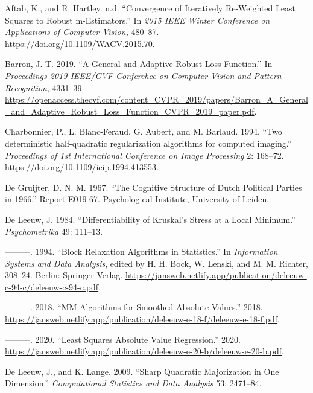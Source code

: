 \documentclass[
  12pt,
  letterpaper,
  DIV=11,
  numbers=noendperiod]{scrartcl}
\newlength{\cslhangindent}
\newenvironment{CSLReferences}[2] %
 {\begin{list}{}{%
  \setlength{\itemindent}{0pt}
  \setlength{\leftmargin}{0pt}
  \setlength{\parsep}{0pt}
  \ifodd #1
   \setlength{\leftmargin}{\cslhangindent}
   \setlength{\itemindent}{-1\cslhangindent}
  \fi
  \setlength{\itemsep}{#2\baselineskip}}}
 {\end{list}}
\begin{document}
\label{refs}
\begin{CSLReferences}{1}{0}
Aftab, K., and R. Hartley. n.d. {``Convergence of Iteratively
Re-Weighted Least Squares to Robust m-Estimators.''} In \emph{2015 IEEE
Winter Conference on Applications of Computer Vision,} 480--87.
\url{https://doi.org/10.1109/WACV.2015.70}.

Barron, J. T. 2019. {``A General and Adaptive Robust Loss Function.''}
In \emph{Proceedings 2019 IEEE/CVF Conferehce on Computer Vision and
Pattern Recognition}, 4331--39.
\url{https://openaccess.thecvf.com/content_CVPR_2019/papers/Barron_A_General_and_Adaptive_Robust_Loss_Function_CVPR_2019_paper.pdf}.

Charbonnier, P., L. Blanc-Feraud, G. Aubert, and M. Barlaud. 1994.
{``{Two deterministic half-quadratic regularization algorithms for
computed imaging}.''} \emph{Proceedings of 1st International Conference
on Image Processing} 2: 168--72.
\url{https://doi.org/10.1109/icip.1994.413553}.

De Gruijter, D. N. M. 1967. {``{The Cognitive Structure of Dutch
Political Parties in 1966}.''} Report E019-67. Psychological Institute,
University of Leiden.

De Leeuw, J. 1984. {``{Differentiability of Kruskal's Stress at a Local
Minimum}.''} \emph{Psychometrika} 49: 111--13.

---------. 1994. {``{Block Relaxation Algorithms in Statistics}.''} In
\emph{Information Systems and Data Analysis}, edited by H. H. Bock, W.
Lenski, and M. M. Richter, 308--24. Berlin: Springer Verlag.
\url{https://jansweb.netlify.app/publication/deleeuw-c-94-c/deleeuw-c-94-c.pdf}.

---------. 2018. {``{MM Algorithms for Smoothed Absolute Values}.''}
2018.
\url{https://jansweb.netlify.app/publication/deleeuw-e-18-f/deleeuw-e-18-f.pdf}.

---------. 2020. {``{Least Squares Absolute Value Regression}.''} 2020.
\url{https://jansweb.netlify.app/publication/deleeuw-e-20-b/deleeuw-e-20-b.pdf}.

De Leeuw, J., and K. Lange. 2009. {``Sharp Quadratic Majorization in One
Dimension.''} \emph{Computational Statistics and Data Analysis} 53:
2471--84.


\end{CSLReferences}
\end{document}
